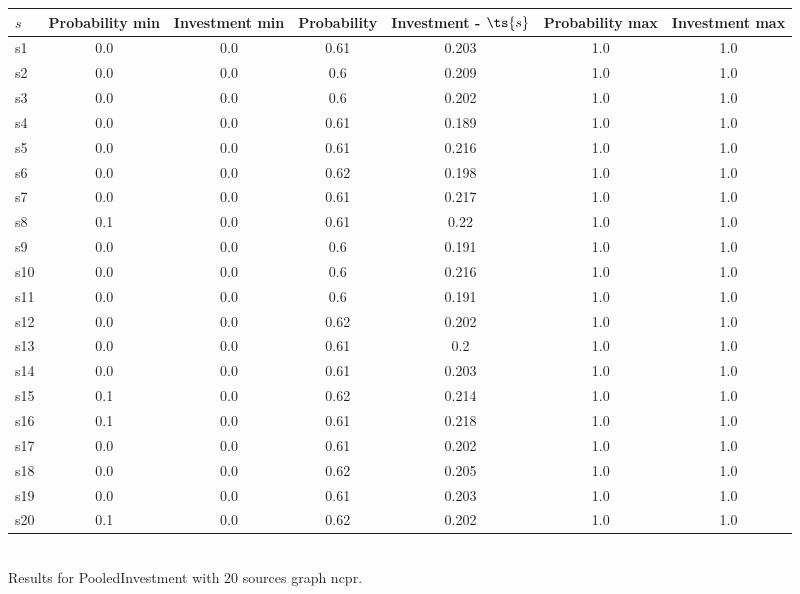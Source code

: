 \documentclass{article}
\begin{document}
\noindent\begin{tabular}{|l|c|c|c|c|c|c|}
\hline
$s$& Probability min & Investment min & Probability & Investment - $\ts{s}$ & Probability max & Investment max\\
\hline
s1 &0.0 & 0.0 & 0.61 & 0.203 & 1.0 & 1.0\\
\hline
s2 &0.0 & 0.0 & 0.6 & 0.209 & 1.0 & 1.0\\
\hline
s3 &0.0 & 0.0 & 0.6 & 0.202 & 1.0 & 1.0\\
\hline
s4 &0.0 & 0.0 & 0.61 & 0.189 & 1.0 & 1.0\\
\hline
s5 &0.0 & 0.0 & 0.61 & 0.216 & 1.0 & 1.0\\
\hline
s6 &0.0 & 0.0 & 0.62 & 0.198 & 1.0 & 1.0\\
\hline
s7 &0.0 & 0.0 & 0.61 & 0.217 & 1.0 & 1.0\\
\hline
s8 &0.1 & 0.0 & 0.61 & 0.22 & 1.0 & 1.0\\
\hline
s9 &0.0 & 0.0 & 0.6 & 0.191 & 1.0 & 1.0\\
\hline
s10 &0.0 & 0.0 & 0.6 & 0.216 & 1.0 & 1.0\\
\hline
s11 &0.0 & 0.0 & 0.6 & 0.191 & 1.0 & 1.0\\
\hline
s12 &0.0 & 0.0 & 0.62 & 0.202 & 1.0 & 1.0\\
\hline
s13 &0.0 & 0.0 & 0.61 & 0.2 & 1.0 & 1.0\\
\hline
s14 &0.0 & 0.0 & 0.61 & 0.203 & 1.0 & 1.0\\
\hline
s15 &0.1 & 0.0 & 0.62 & 0.214 & 1.0 & 1.0\\
\hline
s16 &0.1 & 0.0 & 0.61 & 0.218 & 1.0 & 1.0\\
\hline
s17 &0.0 & 0.0 & 0.61 & 0.202 & 1.0 & 1.0\\
\hline
s18 &0.0 & 0.0 & 0.62 & 0.205 & 1.0 & 1.0\\
\hline
s19 &0.0 & 0.0 & 0.61 & 0.203 & 1.0 & 1.0\\
\hline
s20 &0.1 & 0.0 & 0.62 & 0.202 & 1.0 & 1.0\\
\hline
\end{tabular}\\

\noindent Results for PooledInvestment with 20 sources graph ncpr.
\end{document}
